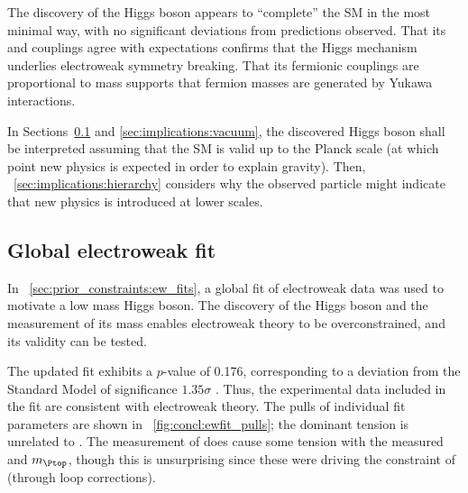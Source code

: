 
The discovery of the Higgs boson appears to ``complete'' the SM in the most minimal way, 
with no significant deviations from predictions observed. That its 
\HepProcess{\PHiggs\PW\PW} and \HepProcess{\PHiggs\PZ\PZ} couplings agree with 
expectations confirms that the Higgs mechanism underlies electroweak symmetry breaking. 
That its fermionic couplings are proportional to mass supports that fermion masses are 
generated by Yukawa interactions.

In Sections~\ref{sec:implications:ewfit} and \ref{sec:implications:vacuum}, the 
discovered Higgs boson shall be interpreted assuming that the SM is valid up to the 
Planck scale (at which point new physics is expected in order to explain gravity). Then, 
\Section~\ref{sec:implications:hierarchy} considers why the observed particle might 
indicate that new physics is introduced at lower scales.



\subsection{Global electroweak fit}
\label{sec:implications:ewfit}

In \Section~\ref{sec:prior_constraints:ew_fits}, a global fit of electroweak data was 
used to motivate a low mass Higgs boson. The discovery of the Higgs boson and the 
measurement of its mass enables electroweak theory to be overconstrained, and its 
validity can be tested. 

The updated fit exhibits a $p$-value of 0.176, corresponding to a deviation from the 
Standard Model of significance $1.35\sigma$ \cite{Gfitter:2013}. Thus, the experimental 
data included in the fit are consistent with electroweak theory. The pulls of individual 
fit parameters are shown in \Figure~\ref{fig:concl:ewfit_pulls}; the dominant tension is 
unrelated to \mH. The measurement of \mH does cause some tension with the measured \mW 
and $m_{\Ptop}$, though this is unsurprising since these were driving the constraint of 
\mH (through loop corrections).

